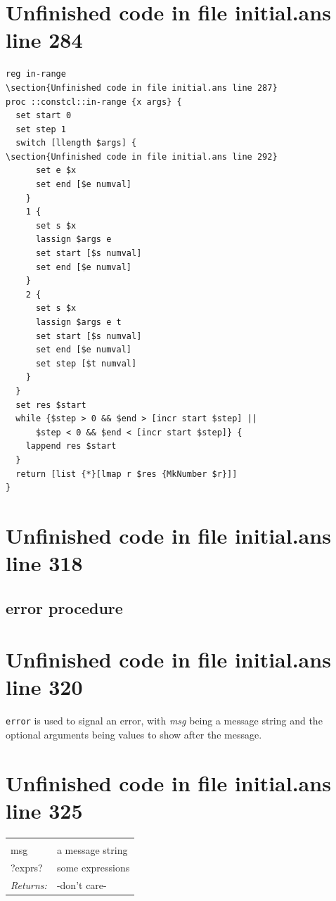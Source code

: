 \documentclass[twoside,9pt]{report}
\begin{document}
\section{Unfinished code in file initial.ans line 284}
\begin{lstlisting}
reg in-range
\section{Unfinished code in file initial.ans line 287}
proc ::constcl::in-range {x args} {
  set start 0
  set step 1
  switch [llength $args] {
\section{Unfinished code in file initial.ans line 292}
      set e $x
      set end [$e numval]
    }
    1 {
      set s $x
      lassign $args e
      set start [$s numval]
      set end [$e numval]
    }
    2 {
      set s $x
      lassign $args e t
      set start [$s numval]
      set end [$e numval]
      set step [$t numval]
    }
  }
  set res $start
  while {$step > 0 && $end > [incr start $step] ||
      $step < 0 && $end < [incr start $step]} {
    lappend res $start
  }
  return [list {*}[lmap r $res {MkNumber $r}]]
}
\end{lstlisting}
\section{Unfinished code in file initial.ans line 318}
\subsection{error procedure}
\label{error-procedure}
\section{Unfinished code in file initial.ans line 320}


\texttt{error} is used to signal an error, with \emph{msg} being a message string and the optional arguments being values to show after the message.

\section{Unfinished code in file initial.ans line 325}
\noindent\begin{tabular}{ |p{1.9cm} p{8cm}| }
\hline
\rowcolor[HTML]{CCCCCC} \multicolumn{2}{|l|}{\bf error (public)} \\
msg & a message string \\
?exprs? & some expressions \\
\textit{Returns:} & -don't care- \\
\hline
\end{tabular}
\end{document}
